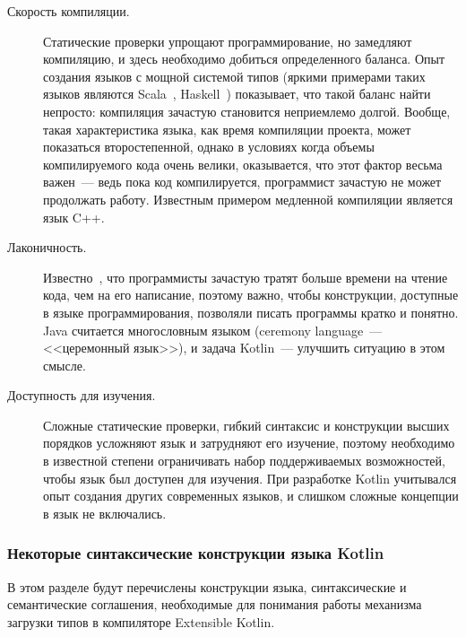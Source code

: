 \begin{description}
	\item[Скорость компиляции.] Статические проверки упрощают программирование, но замедляют компиляцию, и здесь необходимо добиться определенного баланса. Опыт создания языков с мощной системой типов (яркими примерами таких языков являются Scala~\cite{scala-spec}, Haskell~\cite{haskell98}) показывает, что такой баланс найти непросто: компиляция зачастую становится неприемлемо долгой.
	Вообще, такая характеристика языка, как время компиляции проекта, может показаться второстепенной, однако в условиях когда объемы компилируемого кода очень велики, оказывается, что этот фактор весьма важен~--- ведь пока код компилируется, программист зачастую не может продолжать работу. Известным примером медленной компиляции является язык C++.

	\item[Лаконичность.] Известно~\cite{codecomplete}, что программисты зачастую тратят больше времени на чтение кода, чем на его написание, поэтому важно, чтобы конструкции, доступные в языке программирования, позволяли писать программы кратко и понятно.
	Java считается многословным языком (ceremony language~--- <<церемонный язык>>), и задача Kotlin~--- улучшить ситуацию в этом смысле.

	\item[Доступность для изучения.] Сложные статические проверки, гибкий синтаксис и конструкции высших порядков усложняют язык и затрудняют его изучение, поэтому необходимо в известной степени ограничивать набор поддерживаемых возможностей, чтобы язык был доступен для изучения. При разработке Kotlin учитывался опыт создания других современных языков, и слишком сложные концепции в язык не включались.
\end{description}

\subsubsection{Некоторые синтаксические конструкции языка Kotlin}

В этом разделе будут перечислены конструкции языка, синтаксические и семантические соглашения, необходимые для понимания работы механизма загрузки типов в компиляторе Extensible Kotlin.

